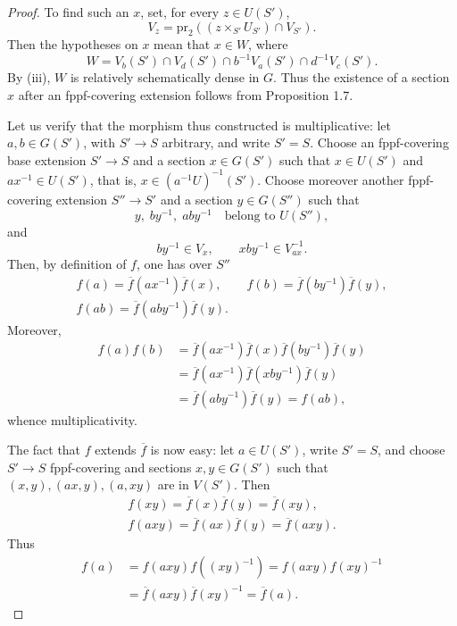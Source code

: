 \begin{proof}
To find such an \(x\), set, for every \(z\in U(S')\),
\[
V_z=\mathrm{pr}_2((z\times_{S'}U_{S'})\cap V_{S'}).
\]
Then the hypotheses on \(x\) mean that \(x\in W\), where
\[
W=V_b(S')\cap V_d(S')\cap b^{-1}V_a(S')\cap d^{-1}V_c(S').
\]
By (iii), \(W\) is relatively schematically
dense in \(G\).
Thus the existence of a section \(x\)
after an fppf-covering extension follows
from Proposition 1.7.

Let us verify that the morphism thus
constructed is multiplicative:
let \(a,b\in G(S')\), with \(S'\to S\)
arbitrary, and write \(S'=S\).
Choose an fppf-covering base extension
\(S'\to S\) and a section \(x\in G(S')\)
such that \(x\in U(S')\) and
\(ax^{-1}\in U(S')\), that is,
\(x\in(a^{-1}U)^{-1}(S')\).
Choose moreover another fppf-covering
extension \(S''\to S'\) and a section
\(y\in G(S'')\) such that
\[
y,\;by^{-1},\;aby^{-1}\quad\text{belong to }U(S''),
\]
and
\[
by^{-1}\in V_x,\qquad xby^{-1}\in V_{ax}^{-1}.
\]
Then, by definition of \(f\), one has over \(S''\)
\[
\begin{gathered}
f(a)=\overline f(ax^{-1})\overline f(x),\qquad
f(b)=\overline f(by^{-1})\overline f(y),\\
f(ab)=\overline f(aby^{-1})\overline f(y).
\end{gathered}
\]
Moreover,
\[
\begin{aligned}
f(a)f(b)
 &=\overline f(ax^{-1})\overline f(x)
\overline f(by^{-1})\overline f(y)\\
 &=\overline f(ax^{-1})\overline f(xby^{-1})\overline f(y)\\
 &=\overline f(aby^{-1})\overline f(y)=f(ab),
\end{aligned}
\]
whence multiplicativity.

The fact that \(f\) extends \(\overline f\)
is now easy: let \(a\in U(S')\), write
\(S'=S\), and choose \(S'\to S\)
fppf-covering and sections
\(x,y\in G(S')\) such that
\((x,y),(ax,y),(a,xy)\) are in \(V(S')\).
Then
\[
\begin{gathered}
f(xy)=\overline f(x)\overline f(y)=\overline f(xy),\\
f(axy)=\overline f(ax)\overline f(y)=\overline f(axy).
\end{gathered}
\]
Thus
\[
\begin{aligned}
f(a)&=f(axy)f((xy)^{-1})
=f(axy)f(xy)^{-1}\\
&=\overline f(axy)\overline f(xy)^{-1}=\overline f(a).
\end{aligned}
\]
\end{proof}
